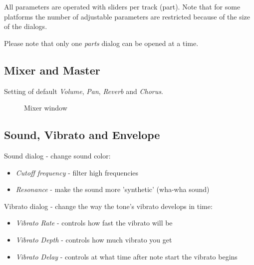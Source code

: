 \documentclass[letterpaper]{report}
\begin{document}
All parameters are operated with sliders per track (part). Note that for some
platforms the number of adjustable parameters are restricted because of
the size of the dialogs.

Please note that only one {\em parts} dialog can be opened at a time.

\subsection{Mixer and Master}\label{mixer}

Setting of default {\em Volume}, {\em Pan}, {\em Reverb} and {\em Chorus}.

\begin{figure}
\caption{Mixer window}
\end{figure}

\subsection{Sound, Vibrato and Envelope}

Sound dialog - change sound color:

\begin{itemize}
\item {\em Cutoff frequency} - filter high frequencies
\item {\em Resonance} - make the sound more 'synthetic' (wha-wha sound)
\end{itemize}

Vibrato dialog - change the way the tone's vibrato develops in time:

\begin{itemize}
\item {\em Vibrato Rate} - controls how fast the vibrato will be
\item {\em Vibrato Depth} - controls how much vibrato you get
\item {\em Vibrato Delay} - controls at what time after note start the
vibrato begins
\end{itemize}
\end{document}
